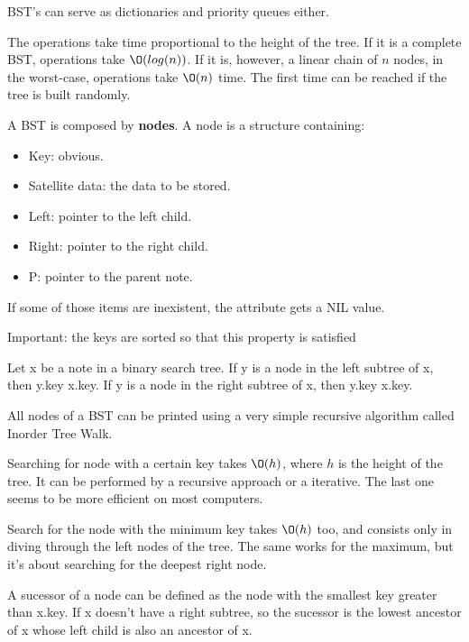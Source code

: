 BST's can serve as dictionaries and priority queues either.

The operations take time proportional to the height of the tree. If it is a complete BST, operations take $\O(log (n))$.  If it is, however, a linear chain of $n$ nodes, in the worst-case, operations take $\O(n)$ time. The first time can be reached if the tree is built randomly.

A BST is composed by \textbf{nodes}. A node is a structure containing:
\begin{itemize}
	\item Key: obvious.
	\item Satellite data: the data to be stored.
	\item Left: pointer to the left child.
	\item Right: pointer to the right child.
	\item P: pointer to the parent note.
\end{itemize}

If some of those items are inexistent, the attribute gets a NIL value.

Important: the keys are sorted so that this property is satisfied

Let x be a note in a binary search tree. If y is a node in the left subtree of x,
then y.key \le x.key. If y is a node in the right subtree of x, then
y.key \ge x.key.

All nodes of a BST can be printed using a very simple recursive algorithm called Inorder Tree Walk.

Searching for node with a certain key takes $\O(h)$, where $h$ is the height of the tree. It can be performed by a recursive approach or a iterative. The last one seems to be more
efficient on most computers.

Search for the node with the minimum key takes $\O(h)$ too, and consists only in diving through the left nodes of the tree. The same works for the maximum, but it's about searching for the deepest right node.

A sucessor of a node can be defined as the node with the smallest key greater than x.key. If x doesn't have a right subtree, so the sucessor is the lowest ancestor of x whose left child is also an ancestor of x.

